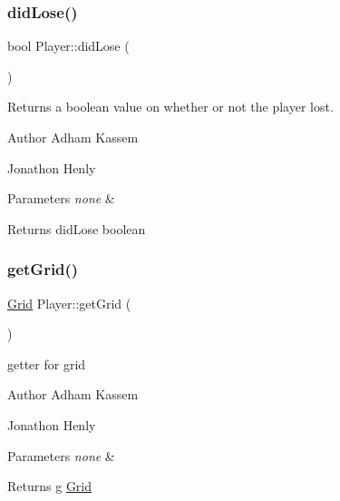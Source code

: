 \subsubsection{\texorpdfstring{did\+Lose()}{didLose()}}
{\footnotesize\ttfamily bool Player\+::did\+Lose (\begin{DoxyParamCaption}{ }\end{DoxyParamCaption})\hspace{0.3cm}{\ttfamily [inline]}}

Returns a boolean value on whether or not the player lost. \begin{DoxyAuthor}{Author}
Adham Kassem 

Jonathon Henly 
\end{DoxyAuthor}

\begin{DoxyParams}{Parameters}
{\em none} & \\
\hline
\end{DoxyParams}
\begin{DoxyReturn}{Returns}
did\+Lose boolean 
\end{DoxyReturn}
\mbox{\label{classPlayer_a23a7fbedccc9bb48a0011878c0822912}} 
\subsubsection{\texorpdfstring{get\+Grid()}{getGrid()}}
{\footnotesize\ttfamily \hyperlink{classGrid}{Grid} Player\+::get\+Grid (\begin{DoxyParamCaption}{ }\end{DoxyParamCaption})\hspace{0.3cm}{\ttfamily [inline]}}

getter for grid \begin{DoxyAuthor}{Author}
Adham Kassem 

Jonathon Henly 
\end{DoxyAuthor}

\begin{DoxyParams}{Parameters}
{\em none} & \\
\hline
\end{DoxyParams}
\begin{DoxyReturn}{Returns}
g \hyperlink{classGrid}{Grid} 
\end{DoxyReturn}
\mbox{\label{classPlayer_a8c60f8670782ecca840ce92fc3893e95}} 
